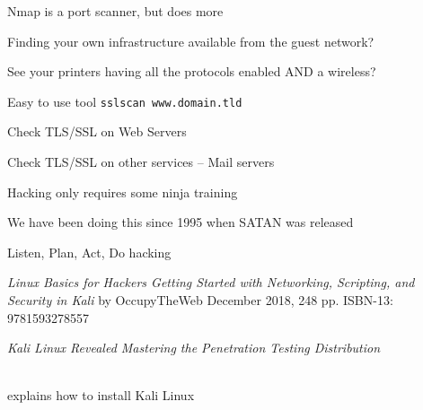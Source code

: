 \documentclass[Screen16to9,17pt]{foils}
\begin{document}
\begin{list2}
\item Nmap is a port scanner, but does more
\item Finding your own infrastructure available from the guest network?
\item See your printers having all the protocols enabled AND a wireless?
\end{list2}


\begin{list2}
\item Easy to use tool \verb+sslscan www.domain.tld+
\item Check TLS/SSL on Web Servers
\item Check TLS/SSL on other services -- Mail servers
\end{list2}



\begin{list2}
\item Hacking only requires some ninja training
\item We have been doing this since 1995 when SATAN was released
\item Listen, Plan, Act, Do hacking
\end{list2}



\emph{Linux Basics for Hackers
Getting Started with Networking, Scripting, and Security in Kali}
by OccupyTheWeb
December 2018, 248 pp.
ISBN-13:
9781593278557




\emph{Kali Linux Revealed  Mastering the Penetration Testing Distribution}

\\
explains how to install Kali Linux





\end{document}
